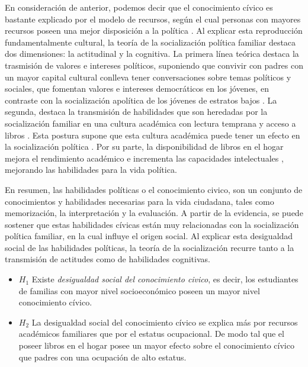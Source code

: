 \documentclass[12pt,twoside]{templates/facsothesis}
\begin{document}
En consideración de anterior, podemos decir que el conocimiento cívico es bastante explicado por el modelo de recursos, según el cual personas con mayores recursos poseen una mejor disposición a la política \citep{mirandaDesigualdadCiudadaniaAproximacion2018}. Al explicar esta reproducción fundamentalmente cultural, la teoría de la socialización política familiar destaca dos dimensiones: la actitudinal y la cognitiva. La primera línea teórica destaca la trasmisión de valores e intereses políticos, suponiendo que convivir con padres con un mayor capital cultural conlleva tener conversaciones sobre temas políticos y sociales, que fomentan valores e intereses democráticos en los jóvenes, en contraste con la socialización apolítica de los jóvenes de estratos bajos \citep{gimpelCultivatingDemocracyCivic2003, wasburnMakingCitizens2017}. La segunda, destaca la transmisión de habilidades que son heredadas por la socialización familiar en una cultura académica con lectura temprana y acceso a libros \citep{evansScholarlyCultureOccupational2015, parkHomeLiteracyEnvironments2008}. Esta postura supone que esta cultura académica puede tener un efecto en la socialización política \citep{duarteInfluenceFamilySchool2017, boeve-depauwCrossnationalPerspectiveYouth2010}. Por su parte, la disponibilidad de libros en el hogar mejora el rendimiento académico e incrementa las capacidades intelectuales \citep{evansScholarlyCultureOccupational2015, evansScholarlyCultureOccupational2015}, mejorando las habilidades para la vida política.

En resumen, las habilidades políticas o el conocimiento civico, son un conjunto de conocimientos y habilidades necesarias para la vida ciudadana, tales como memorización, la interpretación y la evaluación. A partir de la evidencia, se puede sostener que estas habilidades cívicas están muy relacionadas con la socialización política familiar, en la cual influye el origen social. Al explicar esta desigualdad social de las habilidades políticas, la teoría de la socialización recurre tanto a la transmisión de actitudes como de habilidades cognitivas.

\begin{itemize}
\item
  \(H_1\) Existe \emph{desigualdad social del conocimiento civico}, es decir, los estudiantes de familias con mayor nivel socioeconómico poseen un mayor nivel conocimiento cívico.
\item
  \(H_2\) La desigualdad social del conocimiento cívico se explica más por recursos académicos familiares que por el estatus ocupacional. De modo tal que el poseer libros en el hogar posee un mayor efecto sobre el conocimiento cívico que padres con una ocupación de alto estatus.
\end{itemize}
\end{document}
